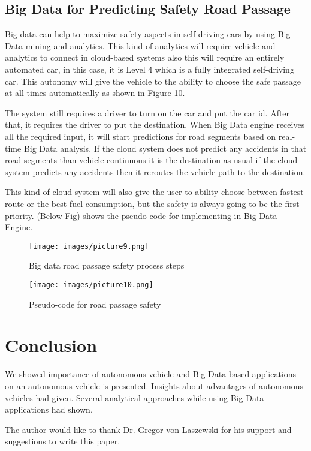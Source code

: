 \documentclass[sigconf]{acmart}
\begin{document}
\subsection{Big Data for Predicting Safety Road Passage}
Big data can help to maximize safety aspects in self-driving cars by using Big Data mining and analytics. This kind of analytics will require vehicle and analytics to connect in cloud-based systems also this will require an entirely automated car, in this case, it is Level 4 which is a fully integrated self-driving car. This autonomy will give the vehicle to the ability to choose the safe passage at all times automatically as shown in Figure 10. \cite{hamzah}
\par The system still requires a driver to turn on the car and put the car id. After that, it requires the driver to put the destination. When Big Data engine receives all the required input, it will start predictions for road segments based on real-time Big Data analysis. If the cloud system does not predict any accidents in that road segments than vehicle continuous it is the destination as usual if the cloud system predicts any accidents then it reroutes the vehicle path to the destination.\cite{hamzah}
\par This kind of cloud system will also give the user to ability choose between fastest route or the best fuel consumption, but the safety is always going to be the first priority. (Below Fig) shows the pseudo-code for implementing in Big Data Engine.
\begin{figure}[!ht]
  \centering
      \texttt{[image: images/picture9.png]}
  \caption{Big data road passage safety process steps}\label{F:architecture}
\end{figure}

\begin{figure}[!ht]
  \centering
      \texttt{[image: images/picture10.png]}
  \caption{Pseudo-code for road passage safety}\label{F:pseudo-code}
\end{figure}

\section{Conclusion}
    We showed importance of autonomous vehicle and Big Data based applications on an autonomous vehicle is presented. Insights about advantages of autonomous vehicles had given. Several analytical approaches while using Big Data applications had shown.

\begin{acks}

The author would like to thank Dr. Gregor von Laszewski for his support and suggestions to write this paper.

\end{acks}


 
\end{document}
